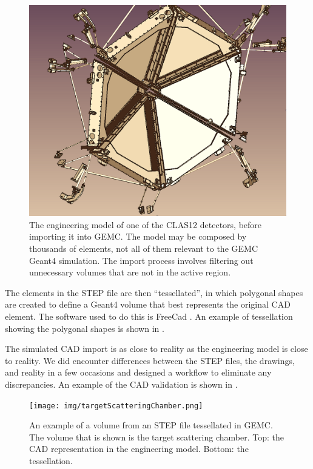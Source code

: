 \begin{figure}[h]
	\centering
	\includegraphics[width=1.0\columnwidth,keepaspectratio]{img/cadSelection.png}
	\caption{ The engineering model of one of the CLAS12 detectors, before importing it into GEMC.
             The model may be composed by thousands of elements, not all of them relevant to the GEMC Geant4 simulation.
             The import process involves filtering out unnecessary volumes that are not in the active region.}
	\label{fig:cadSelection}
\end{figure}

The elements in the STEP file are then ``tessellated'', in which polygonal shapes are created to define a Geant4 volume
that best represents the original CAD element.
The software used to do this is FreeCad \cite{freeCad}. An example of tessellation showing the polygonal shapes
is shown in .

The simulated CAD import is as close to reality as the engineering model is close to reality.
We did encounter differences between the STEP files, the drawings, and reality in a few occasions and designed
a workflow to eliminate any discrepancies.
An example of the CAD validation is shown in .

\begin{figure}
	\centering
	\texttt{[image: img/targetScatteringChamber.png]}
	\caption{An example of a volume from an STEP file tessellated in GEMC. The volume that is shown is the target scattering chamber.
            Top: the CAD representation in the engineering model. Bottom: the tessellation. }
	\label{fig:targetScatteringChamber}
\end{figure}



